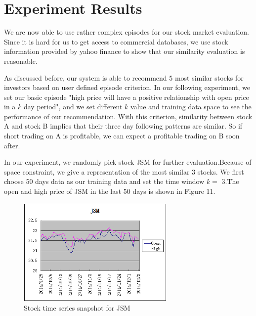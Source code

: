 \documentclass[10pt, conference, compsocconf]{IEEEtran}
\begin{document}
    
          

\section{Experiment Results}
We are now able to use rather complex episodes for our stock market evaluation. Since it is hard for us to get access to commercial databases, we use stock information  provided by yahoo finance to show that our similarity evaluation is reasonable.\\

\par 
As discussed before, our system is able to recommend 5 most similar stocks for investors based on user defined episode criterion. In our following experiment, we set our basic episode "high price will have a positive relationship with open price in a $k$ day period", and we set different $k$ value and training data space to see the performance of our recommendation. With this criterion, similarity between stock A and stock B implies that their three day following patterns are similar. So if short trading on A is profitable, we can expect a profitable trading on B soon after.\\
\par 
In our experiment, we randomly pick stock JSM for further evaluation.Because of space constraint, we give a representation of the most similar 3 stocks. We first choose 50 days data as our training data and set the time window $k=$ 3.The open and high price of JSM in the last 50 days is shown in Figure 11. \\
\par
\vspace{2mm}
 \begin{figure}[!h]
\includegraphics[width=3in]{figures/JSM}
\caption{Stock time series snapshot for JSM}
\vspace{2mm}
 \end{figure}
\par
\end{document}
